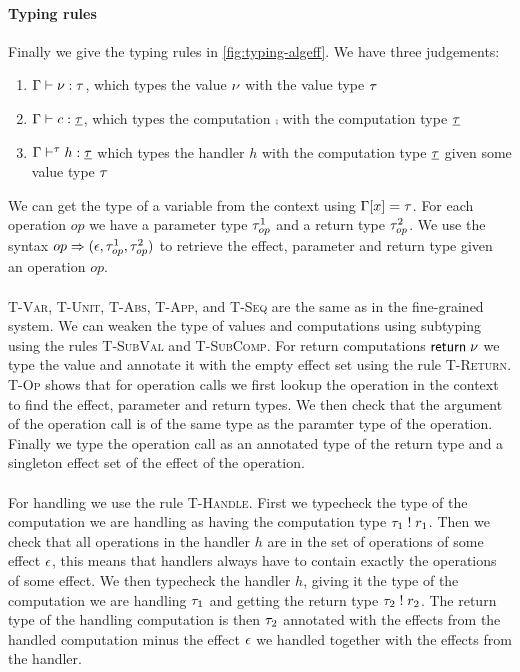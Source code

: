 {\paragraph{Typing rules}
Finally we give the typing rules in \cref{fig:typing-algeff}.
We have three judgements:
\begin{enumerate}
\item $\Gamma \vdash \nu : \tau$, which types the value $\nu$ with the value type $\tau$
\item $\Gamma \vdash c : \underline{\tau}$, which types the computation $\comp$ with the computation type $\underline{\tau}$
\item $\Gamma \vdash^{\tau} h : \underline{\tau}$ which types the handler $h$ with the computation type $\underline{\tau}$ given some value type $\tau$
\end{enumerate}
We can get the type of a variable from the context using $\Gamma[x] = \tau$.
For each operation $op$ we have a parameter type $\tau^1_{op}$ and a return type $\tau^2_{op}$.
We use the syntax $op \Rightarrow (\epsilon, \tau^1_{op}, \tau^2_{op})$ to retrieve the effect, parameter and return type given an operation $op$.
\\\\
\textsc{T-Var}, \textsc{T-Unit}, \textsc{T-Abs}, \textsc{T-App}, and \textsc{T-Seq} are the same as in the fine-grained system.
We can weaken the type of values and computations using subtyping using the rules \textsc{T-SubVal} and \textsc{T-SubComp}.
For return computations $\mathsf{return} \; \nu$ we type the value and annotate it with the empty effect set using the rule \textsc{T-Return}.
\textsc{T-Op} shows that for operation calls we first lookup the operation in the context to find the effect, parameter and return types.
We then check that the argument of the operation call is of the same type as the paramter type of the operation.
Finally we type the operation call as an annotated type of the return type and a singleton effect set of the effect of the operation.
\\\\
For handling we use the rule \textsc{T-Handle}.
First we typecheck the type of the computation we are handling as having the computation type $\tau_1 \; ! \; r_1$.
Then we check that all operations in the handler $h$ are in the set of operations of some effect $\epsilon$, this means that handlers always have to contain exactly the operations of some effect.
We then typecheck the handler $h$, giving it the type of the computation we are handling $\tau_1$  and getting the return type $\tau_2 \; ! \; r_2$.
The return type of the handling computation is then $\tau_2$ annotated with the effects from the handled computation minus the effect $\epsilon$ we handled together with the effects from the handler.
}

